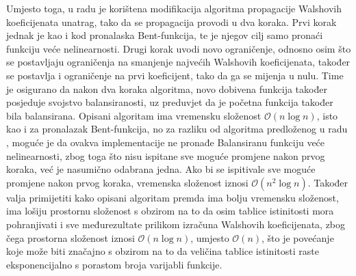 Umjesto toga, u radu je korištena modifikacija algoritma propagacije Walshovih koeficijenata unatrag, tako da se propagacija provodi u dva koraka.
Prvi korak jednak je kao i kod pronalaska Bent-funkcija, te je njegov cilj samo pronaći funkciju veće nelinearnosti.
Drugi korak uvodi novo ograničenje, odnosno osim što se postavljaju ograničenja na smanjenje najvećih Walshovih koeficijenata, također se postavlja i ograničenje na prvi koeficijent, tako da ga se mijenja u nulu.
Time je osigurano da nakon dva koraka algoritma, novo dobivena funkcija također posjeduje svojstvo balansiranosti, uz preduvjet da je početna funkcija također bila balansirana.
Opisani algoritam ima vremensku složenost $\mathcal{O}(n \log n)$, isto kao i za pronalazak Bent-funkcija, no za razliku od algoritma predloženog u radu \cite{millan1997smart}, moguće je da ovakva implementacije ne pronađe Balansiranu funkciju veće nelinearnosti, zbog toga što nisu ispitane sve moguće promjene nakon prvog koraka, već je nasumično odabrana jedna.
Ako bi se ispitivale sve moguće promjene nakon prvog koraka, vremenska složenost iznosi $\mathcal{O}(n^2 \log n)$.
Također valja primijetiti kako opisani algoritam premda ima bolju vremensku složenost, ima lošiju prostornu složenost s obzirom na to da osim tablice istinitosti mora pohranjivati i sve međurezultate prilikom izračuna Walshovih koeficijenata, zbog čega prostorna složenost iznosi $\mathcal{O}(n \log n)$, umjesto $\mathcal{O}(n)$, što je povećanje koje može biti značajno s obzirom na to da veličina tablice istinitosti raste eksponencijalno s porastom broja varijabli funkcije.